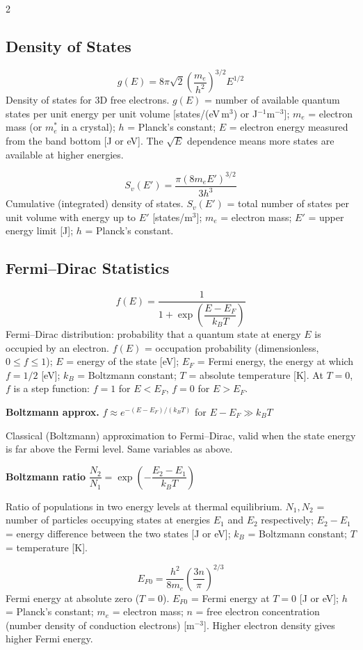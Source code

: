\documentclass[9pt]{extarticle}
\newcommand{\eqlabel}[1]{\textbf{\scriptsize #1}\;}
\newcommand{\desc}[1]{{\small\color{desc}#1}}
\begin{document}
\begin{multicols}{2}
\subsection{Density of States}
\[g(E) = 8\pi\sqrt{2}\left(\frac{m_e}{h^2}\right)^{3/2}E^{1/2}\]
\desc{Density of states for 3D free electrons. $g(E)$ = number of available quantum states per unit energy per unit volume [states/(eV\,m$^3$) or J$^{-1}$m$^{-3}$]; $m_e$ = electron mass (or $m_e^*$ in a crystal); $h$ = Planck's constant; $E$ = electron energy measured from the band bottom [J or eV]. The $\sqrt{E}$ dependence means more states are available at higher energies.}

\[S_v(E') = \frac{\pi(8m_eE')^{3/2}}{3h^3}\]
\desc{Cumulative (integrated) density of states. $S_v(E')$ = total number of states per unit volume with energy up to $E'$ [states/m$^3$]; $m_e$ = electron mass; $E'$ = upper energy limit [J]; $h$ = Planck's constant.}

\subsection{Fermi--Dirac Statistics}
\[f(E) = \frac{1}{1+\exp\!\left(\dfrac{E-E_F}{k_BT}\right)}\]
\desc{Fermi--Dirac distribution: probability that a quantum state at energy $E$ is occupied by an electron. $f(E)$ = occupation probability (dimensionless, $0 \leq f \leq 1$); $E$ = energy of the state [eV]; $E_F$ = Fermi energy, the energy at which $f = 1/2$ [eV]; $k_B$ = Boltzmann constant; $T$ = absolute temperature [K]. At $T = 0$, $f$ is a step function: $f = 1$ for $E < E_F$, $f = 0$ for $E > E_F$.}

\eqlabel{Boltzmann approx.} $f \approx e^{-(E-E_F)/(k_BT)}$ for $E-E_F \gg k_BT$

\desc{Classical (Boltzmann) approximation to Fermi--Dirac, valid when the state energy is far above the Fermi level. Same variables as above.}

\eqlabel{Boltzmann ratio} $\dfrac{N_2}{N_1} = \exp\!\left(-\dfrac{E_2-E_1}{k_BT}\right)$

\desc{Ratio of populations in two energy levels at thermal equilibrium. $N_1, N_2$ = number of particles occupying states at energies $E_1$ and $E_2$ respectively; $E_2 - E_1$ = energy difference between the two states [J or eV]; $k_B$ = Boltzmann constant; $T$ = temperature [K].}

\[E_{F0} = \frac{h^2}{8m_e}\left(\frac{3n}{\pi}\right)^{2/3}\]
\desc{Fermi energy at absolute zero ($T = 0$). $E_{F0}$ = Fermi energy at $T = 0$ [J or eV]; $h$ = Planck's constant; $m_e$ = electron mass; $n$ = free electron concentration (number density of conduction electrons) [m$^{-3}$]. Higher electron density gives higher Fermi energy.}


\end{multicols}
\end{document}
